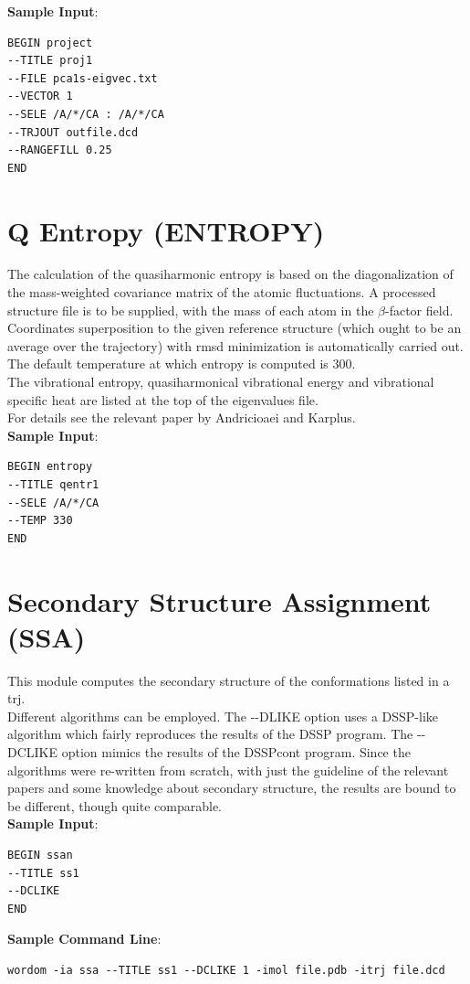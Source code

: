 \documentclass[11pt,twoside,onecolumn,a4paper,openright,notitlepage]{book}[2001/04/21]
\begin{document}
\textbf{\large Sample Input}:
\begin{verbatim}
BEGIN project
--TITLE proj1
--FILE pca1s-eigvec.txt
--VECTOR 1
--SELE /A/*/CA : /A/*/CA
--TRJOUT outfile.dcd
--RANGEFILL 0.25
END
\end{verbatim}
\clearpage

\section{Q Entropy (ENTROPY)}
The calculation of the quasiharmonic entropy is based on the diagonalization of the mass-weighted covariance matrix of the atomic fluctuations. A processed structure file is to be supplied, with the mass of each atom in the $\beta$-factor field. Coordinates superposition to the given reference structure (which ought to be an average over the trajectory) with rmsd minimization is automatically carried out. The default temperature at which entropy is computed is 300.\\
The vibrational entropy, quasiharmonical vibrational energy and vibrational specific heat are listed at the top of the eigenvalues file.\\
For details see the relevant paper by Andricioaei and Karplus\cite{2001JChPh.115.6289A}.\\

\textbf{\large Sample Input}:
\begin{verbatim}
BEGIN entropy
--TITLE qentr1
--SELE /A/*/CA
--TEMP 330
END
\end{verbatim}
\clearpage

\section{Secondary Structure Assignment (SSA)}
This module computes the secondary structure of the conformations listed in a trj.\\ Different algorithms can be employed. The -{}-DLIKE option uses a DSSP-like algorithm which fairly reproduces the results of the DSSP program\cite{DSSP}. The -{}-DCLIKE option mimics the results of the DSSPcont program\cite{DSSP:cont1, DSSP:cont2}. Since the algorithms were re-written from scratch, with just the guideline of the relevant papers and some knowledge about secondary structure, the results are bound to be different, though quite comparable.\\

\textbf{\large Sample Input}:
\begin{verbatim}
BEGIN ssan
--TITLE ss1
--DCLIKE
END
\end{verbatim}
\textbf{\large Sample Command Line}:
\begin{verbatim}
wordom -ia ssa --TITLE ss1 --DCLIKE 1 -imol file.pdb -itrj file.dcd
\end{verbatim}
\clearpage
\end{document}

